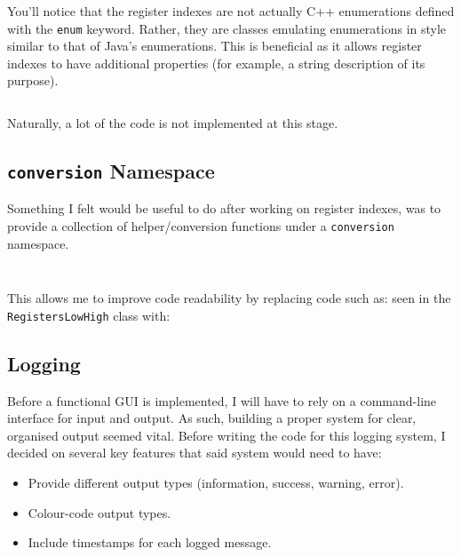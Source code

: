     \inputminted{c++}{code/registerindexes.hpp}

    You'll notice that the register indexes are not actually C++ enumerations defined with the \texttt{enum} keyword. Rather, they are classes emulating enumerations in style similar to that of Java's enumerations. This is beneficial as it allows register indexes to have additional properties (for example, a string description of its purpose).

    \inputminted{c++}{code/registers.hpp}

    Naturally, a lot of the code is not implemented at this stage.

\subsection{\texttt{conversion} Namespace}
    Something I felt would be useful to do after working on register indexes, was to provide a collection of helper/conversion functions under a \texttt{conversion} namespace. 

    \inputminted{c++}{code/conversion.hpp}

    \inputminted{c++}{code/conversion.cpp}

    This allows me to improve code readability by replacing code such as:  seen in the \texttt{RegistersLowHigh} class with: 

\subsection{Logging}
    Before a functional GUI is implemented, I will have to rely on a command-line interface for input and output. As such, building a proper system for clear, organised output seemed vital. Before writing the code for this logging system, I decided on several key features that said system would need to have:
    \begin{itemize}
        \item Provide different output types (information, success, warning, error).
        \item Colour-code output types.
        \item Include timestamps for each logged message.
    \end{itemize}

    \inputminted{c++}{code/logging.hpp}

    \inputminted{C++}{code/logging.cpp}

